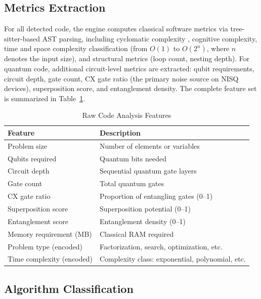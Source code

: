 \documentclass[10pt,conference]{IEEEtran}
\begin{document}
\subsection{Metrics Extraction}

For all detected code, the engine computes classical software metrics via tree-sitter-based AST parsing, including cyclomatic complexity \cite{mccabe1976}, cognitive complexity, time and space complexity classification (from $O(1)$ to $O(2^n)$, where $n$ denotes the input size), and structural metrics (loop count, nesting depth). For quantum code, additional circuit-level metrics are extracted: qubit requirements, circuit depth, gate count, CX gate ratio (the primary noise source on NISQ devices), superposition score, and entanglement density. The complete feature set is summarized in Table~\ref{tab:raw-features}.

\begin{table}[htbp]
\caption{Raw Code Analysis Features}
\label{tab:raw-features}
\centering
\footnotesize
\begin{tabular}{p{} p{}}
\toprule
\textbf{Feature} & \textbf{Description} \\
\midrule
Problem size & Number of elements or variables \\
Qubits required & Quantum bits needed \\
Circuit depth & Sequential quantum gate layers \\
Gate count & Total quantum gates \\
CX gate ratio & Proportion of entangling gates (0--1) \\
Superposition score & Superposition potential (0--1) \\
Entanglement score & Entanglement density (0--1) \\
Memory requirement (MB) & Classical RAM required \\
Problem type (encoded) & Factorization, search, optimization, etc. \\
Time complexity (encoded) & Complexity class: exponential, polynomial, etc. \\
\bottomrule
\end{tabular}
\end{table}

\subsection{Algorithm Classification}
\end{document}
